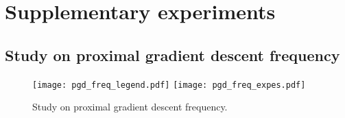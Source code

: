 \section{Supplementary experiments}\label{sec:supp_expes}

\subsection{Study on proximal gradient descent frequency}

\begin{figure*}[htb]
  \centering
  \texttt{[image: pgd\_freq\_legend.pdf]}
  \texttt{[image: pgd\_freq\_expes.pdf]}
  \caption{Study on proximal gradient descent frequency.}
  \label{fig:pgd_freq}
\end{figure*}
